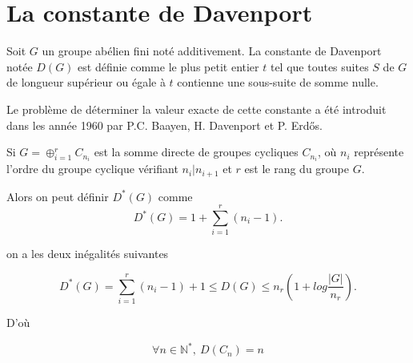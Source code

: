\documentclass[12pt, openany]{report}
\def \N {\mathbb{N}}
\begin{document}
\section {La constante de Davenport}


Soit $G$ un groupe abélien fini noté additivement. La constante de Davenport notée $D(G)$ est définie comme le plus petit entier $t$ tel que toutes suites $S$ de $G$ de longueur supérieur ou égale à $t$ contienne une sous-suite de somme nulle.

Le problème de déterminer la valeur exacte de cette constante a été introduit dans les année 1960 par P.C. Baayen, H. Davenport et P. Erd\H{o}s.

Si $G=\oplus_{i=1}^{r} C_{n_{i}}$ est la somme directe de groupes cycliques $C_{n_{i}}$, où $n_{i}$ représente l'ordre du groupe cyclique vérifiant $n_{i} \vert n_{i+1}$ et $r$ est le rang du groupe $G$. 

Alors on peut définir $D^{*}(G)$ comme 
$$D^{*}(G)=1+\sum_{i=1}^{r}(n_{i}-1).$$

 on a les deux inégalités suivantes
 
$$ D^{*}(G)=\sum_{i=1}^{r}(n_{i}-1)+1\leq D(G)\leq n_{r}\left(1+log \frac{|G|}{n_{r}}\right).$$

D'où 

$$\forall n \in \N^{*}, \ D(C_{n})=n $$
\end{document}
